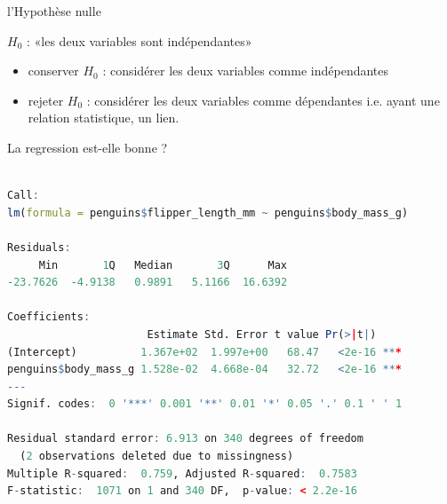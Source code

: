 \documentclass{beamer}
\begin{document}
\begin{frame}[fragile]{ l'Hypothèse nulle }

$H_0$ : «les deux variables sont indépendantes»

\begin{itemize}
  \item \alert{conserver} $H_0$ : considérer les deux variables comme \alert{indépendantes}
  \item \alert{rejeter} $H_0$ : considérer les deux variables comme \alert{dépendantes} i.e. ayant une relation statistique, un lien.
\end{itemize}


\end{frame}






\begin{frame}[fragile]{La regression est-elle bonne ? }



\begin{tiny}
\begin{spacing}{0.75}
\begin{lstlisting}[language=R,basicstyle=\scriptsize\ttfamily, commentstyle=\ttfamily]

Call:
lm(formula = penguins$flipper_length_mm ~ penguins$body_mass_g)

Residuals:
     Min       1Q   Median       3Q      Max 
-23.7626  -4.9138   0.9891   5.1166  16.6392 

Coefficients:
                      Estimate Std. Error t value Pr(>|t|)    
(Intercept)          1.367e+02  1.997e+00   68.47   <2e-16 ***
penguins$body_mass_g 1.528e-02  4.668e-04   32.72   <2e-16 ***
---
Signif. codes:  0 '***' 0.001 '**' 0.01 '*' 0.05 '.' 0.1 ' ' 1

Residual standard error: 6.913 on 340 degrees of freedom
  (2 observations deleted due to missingness)
Multiple R-squared:  0.759,	Adjusted R-squared:  0.7583 
F-statistic:  1071 on 1 and 340 DF,  p-value: < 2.2e-16
\end{lstlisting}
\end{spacing}
\end{tiny}


\end{frame}
\end{document}
